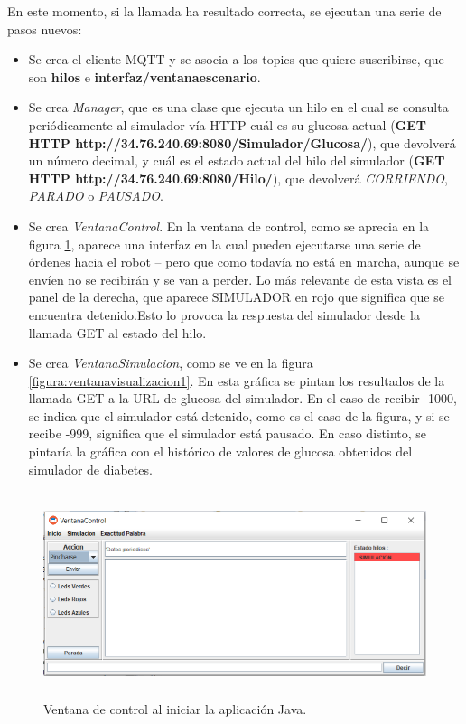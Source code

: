 \documentclass[12pt,spanish,listoffigures,listoftables]{tfgetsinf}
\begin{document}
En este momento, si la llamada ha resultado correcta, se ejecutan una serie de pasos nuevos:
\begin{itemize}
	\item Se crea el cliente MQTT y se asocia a los topics que quiere suscribirse, que son \textbf{hilos} e \textbf{interfaz/ventanaescenario}.
	\item Se crea \textit{Manager}, que es una clase que ejecuta un hilo en el cual se consulta periódicamente al simulador vía HTTP cuál es su glucosa actual (\textbf{GET HTTP http://34.76.240.69:8080/Simulador/Glucosa/}), que devolverá un número decimal, y cuál es el estado actual del hilo del simulador (\textbf{GET HTTP http://34.76.240.69:8080/Hilo/}), que devolverá \textit{CORRIENDO}, \textit{PARADO} o \textit{PAUSADO}.
	\item Se crea \textit{VentanaControl}. En la ventana de control, como se aprecia en la figura \ref{figura:ventanacontrol1}, aparece una interfaz en la cual pueden ejecutarse una serie de órdenes hacia el robot -- pero que como todavía no está en marcha, aunque se envíen no se recibirán y se van a perder. Lo más relevante de esta vista es el panel de la derecha, que aparece SIMULADOR en rojo que significa que se encuentra detenido.Esto lo provoca la respuesta del simulador desde la llamada GET al estado del hilo.
	\item Se crea \textit{VentanaSimulacion}, como se ve en la figura \ref{figura:ventanavisualizacion1}. En esta gráfica se pintan los resultados de la llamada GET a la URL de glucosa del simulador. En el caso de recibir -1000, se indica que el simulador está detenido, como es el caso de la figura, y si se recibe -999, significa que el simulador está pausado. En caso distinto, se pintaría la gráfica con el histórico de valores de glucosa obtenidos del simulador de diabetes.
\end{itemize}

\begin{figure}[!h]
	\centering
	\includegraphics[height=6cm]{img/ventanacontrol1}
	\caption{Ventana de control al iniciar la aplicación Java.}
	\label{figura:ventanacontrol1}
\end{figure}
\end{document}
